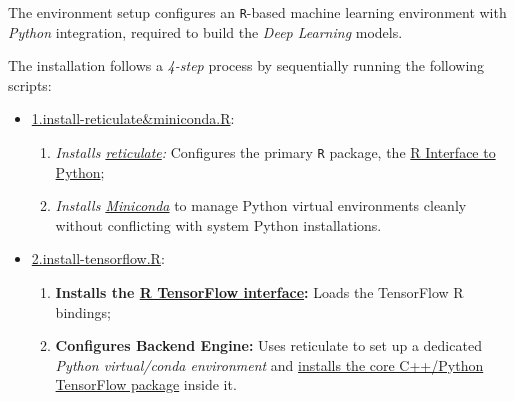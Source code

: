 \documentclass[
]{report}
\providecommand{\tightlist}{%
  \setlength{\itemsep}{0pt}\setlength{\parskip}{0pt}}
\begin{document}
The environment setup configures an \texttt{R}-based machine learning environment with \emph{Python} integration, required to build the \emph{Deep Learning} models.

The installation follows a \emph{4-step} process by sequentially running the following scripts:

\begin{itemize}
\tightlist
\item
  \href{https://github.com/AzKurban-edX-DS/edx.capstone.choose-your-own/blob/main/r/support-scripts/setup-env/1.install-reticulate&miniconda.R}{1.install-reticulate\&miniconda.R}:

  \begin{enumerate}
  \def\labelenumi{\arabic{enumi}.}
  \tightlist
  \item
    \emph{Installs \href{https://rstudio.github.io/reticulate/articles/package.html}{reticulate}:} Configures the primary \texttt{R} package, the \href{https://rstudio.github.io/reticulate/}{R Interface to Python};
  \item
    \emph{Installs \href{https://continuumio-docs.readthedocs-hosted.com/miniconda/}{Miniconda}} to manage Python virtual environments cleanly without conflicting with system Python installations.
  \end{enumerate}
\end{itemize}

\protect{}\label{env_setup.step2}
\begin{itemize}
\tightlist
\item
  \href{https://github.com/AzKurban-edX-DS/edx.capstone.choose-your-own/blob/main/r/support-scripts/setup-env/2.install-tensorflow.R}{2.install-tensorflow.R}:

  \begin{enumerate}
  \def\labelenumi{\arabic{enumi}.}
  \tightlist
  \item
    \textbf{Installs the \href{https://github.com/rstudio/tensorflow}{R TensorFlow interface}:} Loads the TensorFlow R bindings;
  \item
    \textbf{Configures Backend Engine:} Uses reticulate to set up a dedicated \emph{Python virtual/conda environment} and \href{https://tensorflow.rstudio.com/install/}{installs the core C++/Python TensorFlow package} inside it.
  \end{enumerate}
\end{itemize}
\end{document}
